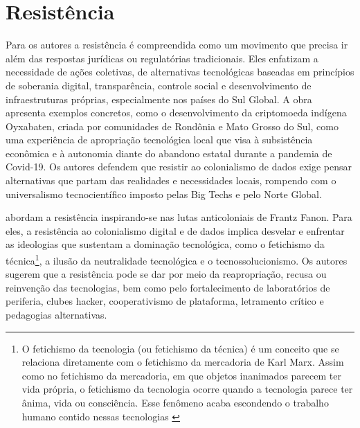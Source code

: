 

\section{Resistência}
\label{sec:resitencie}

Para os autores  a resistência é compreendida como um movimento que precisa ir além das respostas jurídicas ou regulatórias tradicionais. Eles enfatizam a necessidade de ações coletivas, de alternativas tecnológicas baseadas em princípios de soberania digital, transparência, controle social e desenvolvimento de infraestruturas próprias, especialmente nos países do Sul Global. A obra apresenta exemplos concretos, como o desenvolvimento da criptomoeda indígena Oyxabaten, criada por comunidades de Rondônia e Mato Grosso do Sul, como uma experiência de apropriação tecnológica local que visa à subsistência econômica e à autonomia diante do abandono estatal durante a pandemia de Covid-19. Os autores defendem que resistir ao colonialismo de dados exige pensar alternativas que partam das realidades e necessidades locais, rompendo com o universalismo tecnocientífico imposto pelas Big Techs e pelo Norte Global.

 abordam a resistência inspirando-se nas lutas anticoloniais de Frantz Fanon. Para eles, a resistência ao colonialismo digital e de dados implica desvelar e enfrentar as ideologias que sustentam a dominação tecnológica, como o fetichismo da técnica\footnote{O fetichismo da tecnologia (ou fetichismo da técnica) é um conceito que se relaciona diretamente com o fetichismo da mercadoria de Karl Marx. Assim como no fetichismo da mercadoria, em que objetos inanimados parecem ter vida própria, o fetichismo da tecnologia ocorre quando a tecnologia parece ter ânima, vida ou consciência. Esse fenômeno acaba escondendo o trabalho humano contido nessas tecnologias \cite{Faustino2023}}, a ilusão da neutralidade tecnológica e o tecnossolucionismo. Os autores sugerem que a resistência pode se dar por meio da reapropriação, recusa ou reinvenção das tecnologias, bem como pelo fortalecimento de laboratórios de periferia, clubes hacker, cooperativismo de plataforma, letramento crítico e pedagogias alternativas.

